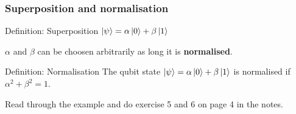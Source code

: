 \documentclass[10pt]{beamer}
\begin{document}
\begin{frame}
  \frametitle{Superposition and normalisation}
  \begin{block}{Definition: Superposition}
    $\ket{\psi}=\alpha \ket{0}+\beta \ket{1}$

    $\alpha$ and $\beta$ can be choosen arbitrarily as long it is \textbf{normalised}.
  \end{block}
  
  \begin{block}{Definition: Normalisation}
    The qubit state $\ket{\psi} = \alpha \ket{0} + \beta \ket{1}$ is normalised if $\alpha^2+\beta^2=1$. 
  \end{block}

   Read through the example and do exercise 5 and 6 on page 4 in the notes.
\end{frame}
\end{document}
